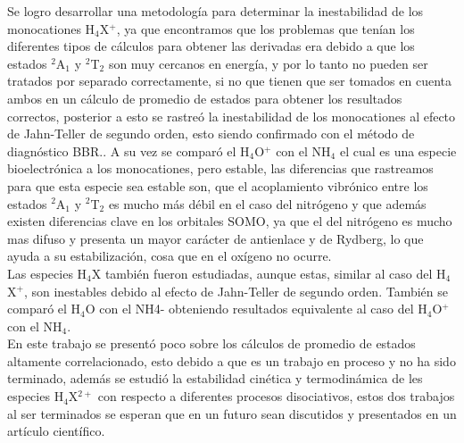 \documentclass[12pt]{report}
\begin{document}
Se logro desarrollar una metodología para determinar la inestabilidad de los monocationes H$_4$X$^+$, ya que encontramos que los problemas que tenían los diferentes tipos de cálculos para obtener las derivadas era debido a que los estados $^2$A$_1$ y $^2$T$_2$ son muy cercanos en energía, y por lo tanto no pueden ser tratados por separado correctamente, si no que tienen que ser tomados en cuenta ambos en un cálculo de promedio de estados para obtener los resultados correctos, posterior a esto se rastreó la inestabilidad de los monocationes al efecto de Jahn-Teller de segundo orden, esto siendo confirmado con el método de diagnóstico BBR.. A su vez se comparó el H$_4$O$^+$ con el NH$_4$ el cual es una especie bioelectrónica a los monocationes, pero estable, las diferencias que rastreamos para que esta especie sea estable son, que el acoplamiento vibrónico entre los estados $^2$A$_1$ y $^2$T$_2$ es mucho más débil en el caso del nitrógeno y que además existen diferencias clave en los orbitales SOMO, ya que el del nitrógeno es mucho mas difuso y presenta un mayor carácter de antienlace y de Rydberg, lo que ayuda a su estabilización, cosa que en el oxígeno no ocurre.
\\


Las especies H$_4$X también fueron estudiadas, aunque estas, similar al caso del H$_4$X$^+$, son inestables debido al efecto de Jahn-Teller de segundo orden. También se comparó el H$_4$O con el NH4- obteniendo resultados equivalente al caso del H$_4$O$^+$ con el NH$_4$.
\\


En este trabajo se presentó poco sobre los cálculos de promedio de estados altamente correlacionado, esto debido a que es un trabajo en proceso y no ha sido terminado, además se estudió la estabilidad cinética y termodinámica de les especies H$_4$X$^{2+}$ con respecto a diferentes procesos disociativos, estos dos trabajos al ser terminados se esperan que en un futuro sean discutidos y presentados en un artículo científico.
\end{document}
